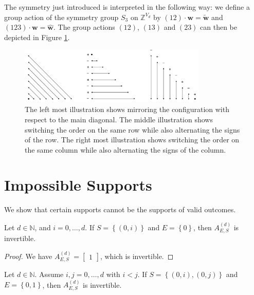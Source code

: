 The symmetry just introduced is interpreted in the following way: we define a group action of the symmetry group \( S_3 \) on \( \mathbb{Z}^{V_d} \) by \( (12) \cdot \mathbf w = \tilde{\mathbf w}  \) and \( (123) \cdot \mathbf w = \hat{\mathbf w} \).
The group actions \( (12) \), \( (13) \) and \( (23) \) can then be depicted in Figure \ref{fig:group-action-s3}.

\begin{figure}[H]
    \centering
    \includegraphics[width=0.8\textwidth]{assets/group-action-s3.png}
    \caption{The left most illustration shows mirroring the configuration with respect to the main diagonal. The middle illustration shows switching the order on the same row while also alternating the signs of the row. The right most illustration shows switching the order on the same column while also alternating the signs of the column.}
    \label{fig:group-action-s3}
\end{figure}

\section{Impossible Supports}\label{sec:impossible-supports}

We show that certain supports cannot be the supports of valid outcomes. 

\begin{proposition}\label{prop:impossible-support-23233243243423}
    Let \( d \in \mathbb{N} \), and \( i=0, \dots, d \). If \( S = \left\{ (0,i) \right\} \) and \( E = \left\{ 0 \right\} \), then \( A^{(d)}_{E,S} \) is invertible.
\end{proposition}

\begin{proof}
    We have \( A^{(d)}_{E,S} = \begin{bmatrix}
        1
    \end{bmatrix} \), which is invertible.
\end{proof}

\begin{proposition}\label{prop:impossible-support-232423}
    Let \( d \in \mathbb{N} \). Assume \( i,j=0, \dots, d \) with \( i < j \). If \( S = \left\{ (0,i), (0,j) \right\} \) and \( E = \left\{ 0,1 \right\} \), then \( A^{(d)}_{E,S} \) is invertible.
\end{proposition}

